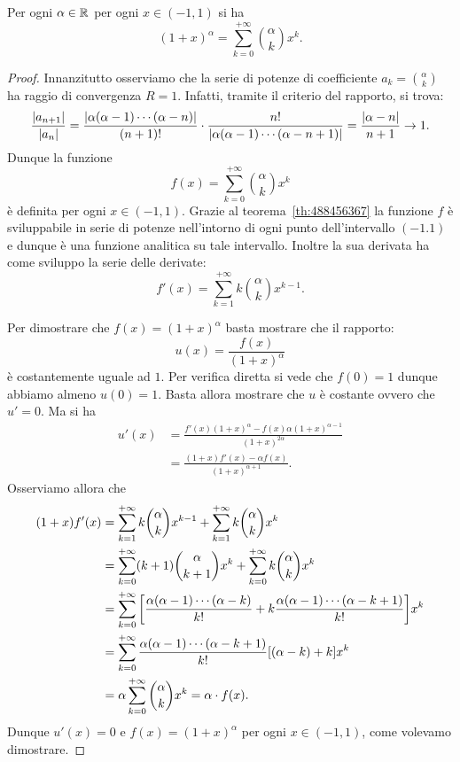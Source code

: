 \begin{theorem}
\label{th:serie_binomiale}%
Per ogni $\alpha\in \mathbb R$ per ogni $x\in (-1,1)$ si ha
\[
  (1+x)^{\alpha}  = \sum_{k=0}^{+\infty} {\alpha \choose k} x^k.
\]
\end{theorem}
%
\begin{proof}
Innanzitutto osserviamo che la serie di potenze di coefficiente
$a_k = {\alpha \choose k}$ ha raggio di convergenza $R=1$.
Infatti, tramite il criterio del rapporto, si trova:
\[
  \frac{{\left|a_{n+1}\right|}}{{\left|a_n\right|}}
  = \frac{{\left|\alpha (\alpha-1) \cdots (\alpha-n)\right|}}{(n+1)!}
  \cdot \frac{n!}{{\left|\alpha(\alpha-1) \cdots (\alpha-n+1)\right|}}
  = \frac{{\left|\alpha-n\right|}}{n+1} \to 1.
\]
Dunque la funzione
\[
 f(x) = \sum_{k=0}^{+\infty} {\alpha \choose k} x^k
\]
è definita per ogni $x\in(-1,1)$.
Grazie al teorema~\ref{th:488456367} la funzione $f$ è sviluppabile
in serie di potenze nell'intorno di ogni punto dell'intervallo $(-1.1)$
e dunque è una funzione analitica su tale intervallo. Inoltre la sua
derivata ha come sviluppo la serie delle derivate:
\[
  f'(x) = \sum_{k=1}^{+\infty} k {\alpha \choose k} x^{k-1}.
\]

Per dimostrare che $f(x) = (1+x)^\alpha$ basta mostrare che il rapporto:
\[
  u(x) = \frac{f(x)}{(1+x)^\alpha}
\]
è costantemente uguale ad $1$. Per verifica diretta si vede che $f(0)=1$
dunque abbiamo almeno $u(0) = 1$. Basta allora mostrare che $u$ è costante
ovvero che $u'=0$. Ma si ha
\begin{align*}
  u'(x)
  &= \frac{f'(x) (1+x)^\alpha - f(x) \alpha (1+x)^{\alpha-1}}{(1+x)^{2\alpha}} \\
  &= \frac{(1+x) f'(x) - \alpha f(x)}{(1+x)^{\alpha+1}}.
\end{align*}
Osserviamo allora che
\begin{align*}
(1+x)f'(x)
&= \sum_{k=1}^{+\infty} k{\alpha \choose k} x^{k-1}
+ \sum_{k=1}^{+\infty} k{\alpha \choose k} x^{k}\\
&= \sum_{k=0}^{+\infty} (k+1){\alpha \choose k+1} x^k
+ \sum_{k=0}^{+\infty} k {\alpha \choose k} x^k \\
&= \sum_{k=0}^{+\infty} {\left[ \frac{\alpha(\alpha-1) \cdots (\alpha-k)}{k!}
 + k \frac{\alpha(\alpha-1)\cdots(\alpha-k+1)}{k!} \right]} x^k \\
 &= \sum_{k=0}^{+\infty} \frac{\alpha(\alpha-1)\cdots(\alpha-k+1)}{k!}{\left[ (\alpha-k)+k \right]} x^k\\
 &= \alpha \sum_{k=0}^{+\infty} {\alpha \choose k} x^k = \alpha \cdot f(x).
\end{align*}
Dunque $u'(x)=0$ e $f(x) = (1+x)^\alpha$ per ogni $x\in(-1,1)$, come
volevamo dimostrare.
\end{proof}

